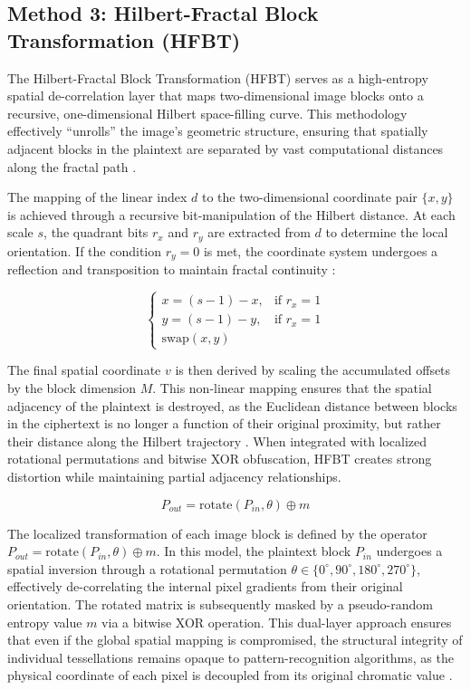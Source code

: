 \documentclass[12pt,fleqn]{article}
\begin{document}
\subsection{Method 3: Hilbert-Fractal Block Transformation (HFBT)}

The Hilbert-Fractal Block Transformation (HFBT) serves as a high-entropy spatial de-correlation layer that maps two-dimensional image blocks onto a recursive, one-dimensional Hilbert space-filling curve. This methodology effectively ``unrolls'' the image's geometric structure, ensuring that spatially adjacent blocks in the plaintext are separated by vast computational distances along the fractal path \cite{moon2001analysis}. 

The mapping of the linear index $d$ to the two-dimensional coordinate pair $\{x, y\}$ is achieved through a recursive bit-manipulation of the Hilbert distance. At each scale $s$, the quadrant bits $r_x$ and $r_y$ are extracted from $d$ to determine the local orientation. If the condition $r_y = 0$ is met, the coordinate system undergoes a reflection and transposition to maintain fractal continuity \cite{warren2013hacker}:

\begin{equation} \label{eq:hilbert_rot}
\begin{cases} 
x = (s-1) - x, & \text{if } r_x = 1 \\
y = (s-1) - y, & \text{if } r_x = 1 \\
\text{swap}(x, y)
\end{cases}
\end{equation}

The final spatial coordinate $v$ is then derived by scaling the accumulated offsets by the block dimension $M$. This non-linear mapping ensures that the spatial adjacency of the plaintext is destroyed, as the Euclidean distance between blocks in the ciphertext is no longer a function of their original proximity, but rather their distance along the Hilbert trajectory \cite{skilling2004programming}. When integrated with localized rotational permutations and bitwise XOR obfuscation, HFBT creates strong distortion while maintaining partial adjacency relationships.

\begin{equation}
P_{out} = \text{rotate}(P_{in}, \theta) \oplus m
\end{equation}

The localized transformation of each image block is defined by the operator $P_{out} = \text{rotate}(P_{in}, \theta) \oplus m$. In this model, the plaintext block $P_{in}$ undergoes a spatial inversion through a rotational permutation $\theta \in \{0^\circ, 90^\circ, 180^\circ, 270^\circ\}$, effectively de-correlating the internal pixel gradients from their original orientation. The rotated matrix is subsequently masked by a pseudo-random entropy value $m$ via a bitwise XOR operation. This dual-layer approach ensures that even if the global spatial mapping is compromised, the structural integrity of individual tessellations remains opaque to pattern-recognition algorithms, as the physical coordinate of each pixel is decoupled from its original chromatic value \cite{menezes2018handbook}.
\end{document}

